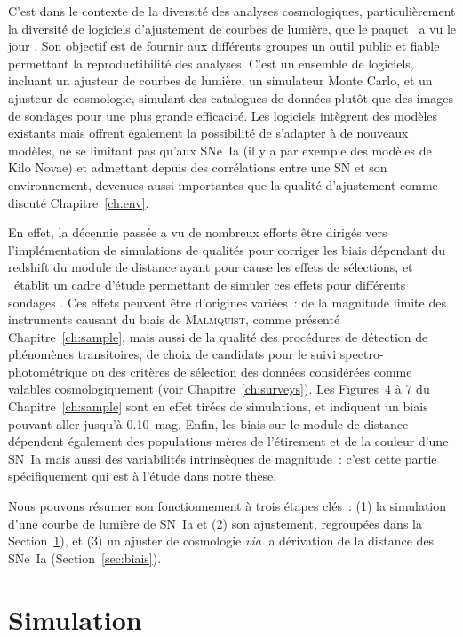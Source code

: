 \documentclass[../main/main.tex]{subfiles}
\begin{document}
C'est dans le contexte de la diversité des analyses cosmologiques,
particulièrement la diversité de logiciels d'ajustement de courbes de lumière,
que le paquet \snana\ a vu le jour \citep{kessler2009a}. Son objectif est de
fournir aux différents groupes un outil public et fiable permettant la
reproductibilité des analyses. C'est un ensemble de logiciels, incluant un
ajusteur de courbes de lumière, un simulateur Monte Carlo, et un ajusteur de
cosmologie, simulant des catalogues de données plutôt que des images de sondages
pour une plus grande efficacité. Les logiciels intègrent des modèles existants
mais offrent également la possibilité de s'adapter à de nouveaux modèles, ne se
limitant pas qu'aux SNe~Ia (il y a par exemple des modèles de Kilo Novae) et
admettant depuis des corrélations entre une SN et son environnement, devenues
aussi importantes que la qualité d'ajustement comme discuté
Chapitre~\ref{ch:env}.

En effet, la décennie passée a vu de nombreux efforts être dirigés vers
l'implémentation de simulations de qualités pour corriger les biais dépendant du
redshift du module de distance ayant pour cause les effets de sélections, et
\snana\ établit un cadre d'étude permettant de simuler ces effets pour
différents sondages \citep{kessler2019}. Ces effets peuvent être d'origines
variées~: de la magnitude limite des instruments causant du biais de
\textsc{Malmquist}, comme présenté Chapitre~\ref{ch:sample}, mais aussi de la
qualité des procédures de détection de phénomènes transitoires, de choix de
candidats pour le suivi spectro-photométrique ou des critères de sélection des
données considérées comme valables cosmologiquement (voir
Chapitre~\ref{ch:surveys}). Les Figures~4 à 7 du Chapitre~\ref{ch:sample} sont
en effet tirées de simulations, et indiquent un biais pouvant aller jusqu'à
\SI{0.10}{mag}. Enfin, les biais sur le module de distance dépendent également
des populations mères de l'étirement et de la couleur d'une SN~Ia mais aussi des
variabilités intrinsèques de magnitude~: c'est cette partie spécifiquement qui
est à l'étude dans notre thèse.

Nous pouvons résumer son fonctionnement à trois étapes clés~: (1) la simulation
d'une courbe de lumière de SN~Ia et (2) son ajustement, regroupées dans la
Section~\ref{sec:snanasim}), et (3) un ajuster de cosmologie \textit{via} la
dérivation de la distance des SNe~Ia (Section~\ref{sec:biais}).

\section{Simulation}\label{sec:snanasim}
\end{document}
